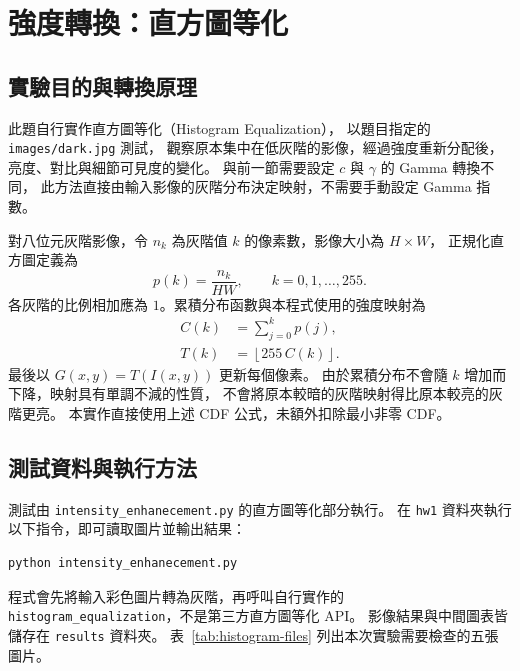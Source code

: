 \clearpage
\section{強度轉換：直方圖等化}
\label{sec:histogram-equalization}

\subsection{實驗目的與轉換原理}

此題自行實作直方圖等化（Histogram Equalization），
以題目指定的 \texttt{images/dark.jpg} 測試，
觀察原本集中在低灰階的影像，經過強度重新分配後，亮度、對比與細節可見度的變化。
與前一節需要設定 $c$ 與 $\gamma$ 的 Gamma 轉換不同，
此方法直接由輸入影像的灰階分布決定映射，不需要手動設定 Gamma 指數。

對八位元灰階影像，令 $n_k$ 為灰階值 $k$ 的像素數，影像大小為 $H\times W$，
正規化直方圖定義為
\begin{equation}
  p(k)=\frac{n_k}{HW}, \qquad k=0,1,\ldots,255.
  \label{eq:histogram-probability}
\end{equation}
各灰階的比例相加應為 $1$。累積分布函數與本程式使用的強度映射為
\begin{align}
  C(k) &= \sum_{j=0}^{k}p(j),
    \label{eq:histogram-cdf}\\
  T(k) &= \left\lfloor255\,C(k)\right\rfloor.
    \label{eq:histogram-mapping}
\end{align}
最後以 $G(x,y)=T(I(x,y))$ 更新每個像素。
由於累積分布不會隨 $k$ 增加而下降，映射具有單調不減的性質，
不會將原本較暗的灰階映射得比原本較亮的灰階更亮。
本實作直接使用上述 CDF 公式，未額外扣除最小非零 CDF。

\subsection{測試資料與執行方法}

測試由 \texttt{intensity\_enhanecement.py} 的直方圖等化部分執行。
在 \texttt{hw1} 資料夾執行以下指令，即可讀取圖片並輸出結果：

\begin{lstlisting}[language={},caption={實驗執行指令}]
python intensity_enhanecement.py
\end{lstlisting}

程式會先將輸入彩色圖片轉為灰階，再呼叫自行實作的
\texttt{histogram\_equalization}，不是第三方直方圖等化 API。
影像結果與中間圖表皆儲存在 \texttt{results} 資料夾。
表~\ref{tab:histogram-files} 列出本次實驗需要檢查的五張圖片。

